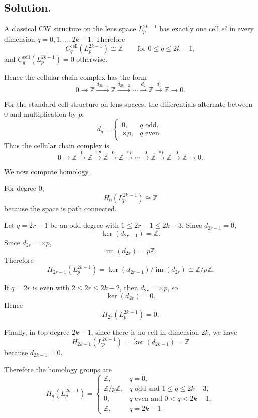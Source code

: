 \documentclass[12pt,a4paper]{article}
\theoremstyle{notespace}
\begin{document}
\subsection*{Solution.}
A classical CW structure on the lens space \(L_p^{2k-1}\) has exactly one cell \(e^q\) in every dimension \(q=0,1,\dots,2k-1\). Therefore
\[
C_q^{\mathrm{cell}}(L_p^{2k-1})\cong \mathbb Z
\qquad \text{for } 0\le q\le 2k-1,
\]
and \(C_q^{\mathrm{cell}}(L_p^{2k-1})=0\) otherwise.

Hence the cellular chain complex has the form
\[
0 \to \mathbb Z \xrightarrow{d_{2k-1}} \mathbb Z \xrightarrow{d_{2k-2}} \cdots
\xrightarrow{d_2} \mathbb Z \xrightarrow{d_1} \mathbb Z \to 0.
\]

For the standard cell structure on lens spaces, the differentials alternate between \(0\) and multiplication by \(p\):
\[
d_q=
\begin{cases}
	0, & q \text{ odd},\\[4pt]
	\times p, & q \text{ even}.
\end{cases}
\]
Thus the cellular chain complex is
\[
0 \to \mathbb Z
\xrightarrow{0}
\mathbb Z
\xrightarrow{\times p}
\mathbb Z
\xrightarrow{0}
\mathbb Z
\xrightarrow{\times p}
\cdots
\xrightarrow{0}
\mathbb Z
\xrightarrow{\times p}
\mathbb Z
\xrightarrow{0}
\mathbb Z
\to 0.
\]

We now compute homology.

\medskip
\noindent
For degree \(0\),
\[
H_0(L_p^{2k-1})\cong \mathbb Z
\]
because the space is path connected.

\medskip
\noindent
Let \(q=2r-1\) be an odd degree with \(1\le 2r-1\le 2k-3\). Since \(d_{2r-1}=0\),
\[
\ker(d_{2r-1})=\mathbb Z.
\]
Since \(d_{2r}=\times p\),
\[
\operatorname{im}(d_{2r})=p\mathbb Z.
\]
Therefore
\[
H_{2r-1}(L_p^{2k-1})
=
\ker(d_{2r-1})/\operatorname{im}(d_{2r})
\cong
\mathbb Z/p\mathbb Z.
\]

\medskip
\noindent
If \(q=2r\) is even with \(2\le 2r\le 2k-2\), then \(d_{2r}=\times p\), so
\[
\ker(d_{2r})=0.
\]
Hence
\[
H_{2r}(L_p^{2k-1})=0.
\]

\medskip
\noindent
Finally, in top degree \(2k-1\), since there is no cell in dimension \(2k\), we have
\[
H_{2k-1}(L_p^{2k-1})=\ker(d_{2k-1})=\mathbb Z
\]
because \(d_{2k-1}=0\).

Therefore the homology groups are
\[
H_q(L_p^{2k-1})=
\begin{cases}
	\mathbb Z, & q=0,\\[4pt]
	\mathbb Z/p\mathbb Z, & q \text{ odd and }1\le q\le 2k-3,\\[4pt]
	0, & q \text{ even and }0<q<2k-1,\\[4pt]
	\mathbb Z, & q=2k-1.
\end{cases}
\]
\end{document}
